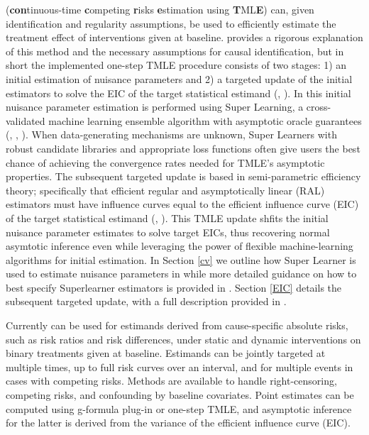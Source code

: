 \documentclass{report}
\newcommand{\1}{\ensuremath{\mathbf{1}}}
\begin{document}
 (\textbf{con}tinuous-time \textbf{c}ompeting \textbf{r}isks \textbf{e}stimation using \textbf{T}ML\textbf{E}) can, given identification and regularity assumptions, be used to efficiently estimate the treatment effect of interventions given at baseline. \cite{rytgaard_one-step_2021} provides a rigorous explanation of this method and the necessary assumptions for causal identification, but in short the implemented one-step TMLE procedure consists of two stages: 1) an initial estimation of nuisance parameters and 2) a targeted update of the initial estimators to solve the EIC of the target statistical estimand (\cite{laan_unified_2003-1}, \cite{kennedy_semiparametric_2016}). In  this initial nuisance parameter estimation is performed using Super Learning, a cross-validated machine learning ensemble algorithm with asymptotic oracle guarantees (\cite{laan_unified_2003}, \cite{laan_super_2007}, \cite{polley_superlearner_2021}). When data-generating mechanisms are unknown, Super Learners with robust candidate libraries and appropriate loss functions often give users the best chance of achieving the convergence rates needed for TMLE's asymptotic properties. The subsequent targeted update is based in semi-parametric efficiency theory; specifically that efficient regular and asymptotically linear (RAL) estimators must have influence curves equal to the efficient influence curve (EIC) of the target statistical estimand (\cite{laan_targeted_2011}, \cite{kennedy_semiparametric_2016}). This TMLE update shfits the initial nuisance parameter estimates to solve target EICs, thus recovering normal asymtotic inference even while leveraging the power of flexible machine-learning algorithms for initial estimation. In Section \ref{cv} we outline how Super Learner is used to estimate nuisance parameters in  while more detailed guidance on how to best specify Superlearner estimators is provided in \cite{phillips_practical_2022}. Section \ref{EIC} details the subsequent targeted update, with a full description provided in \cite{rytgaard_one-step_2021}. 

Currently  can be used for estimands derived from cause-specific absolute risks, such as risk ratios and risk differences, under static and dynamic interventions on binary treatments given at baseline. Estimands can be jointly targeted at multiple times, up to full risk curves over an interval, and for multiple events in cases with competing risks. Methods are available to handle right-censoring, competing risks, and confounding by baseline covariates. Point estimates can be computed using g-formula plug-in or one-step TMLE, and asymptotic inference for the latter is derived from the variance of the efficient influence curve (EIC). 
\end{document}

